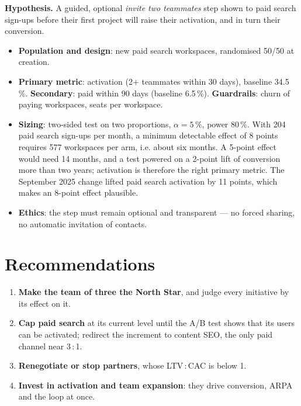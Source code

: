 \documentclass[10pt,a4paper]{article}
\begin{document}
\textbf{Hypothesis.} A guided, optional \emph{invite two teammates} step shown to paid search sign-ups before their first project will raise their activation, and in turn their conversion.
\begin{itemize}
  \item \textbf{Population and design}: new paid search workspaces, randomised 50/50 at creation.
  \item \textbf{Primary metric}: activation (2+ teammates within 30 days), baseline 34.5\,\%. \textbf{Secondary}: paid within 90 days (baseline 6.5\,\%). \textbf{Guardrails}: churn of paying workspaces, seats per workspace.
  \item \textbf{Sizing}: two-sided test on two proportions, $\alpha = 5\,\%$, power 80\,\%. With 204 paid search sign-ups per month, a minimum detectable effect of 8 points requires 577 workspaces per arm, i.e. about six months. A 5-point effect would need 14 months, and a test powered on a 2-point lift of conversion more than two years; activation is therefore the right primary metric. The September 2025 change lifted paid search activation by 11 points, which makes an 8-point effect plausible.
  \item \textbf{Ethics}: the step must remain optional and transparent --- no forced sharing, no automatic invitation of contacts.
\end{itemize}

\section{Recommendations}

\begin{enumerate}
  \item \textbf{Make the team of three the North Star}, and judge every initiative by its effect on it.
  \item \textbf{Cap paid search} at its current level until the A/B test shows that its users can be activated; redirect the increment to content SEO, the only paid channel near 3\,:\,1.
  \item \textbf{Renegotiate or stop partners}, whose LTV\,:\,CAC is below 1.
  \item \textbf{Invest in activation and team expansion}: they drive conversion, ARPA and the loop at once.
\end{enumerate}
\end{document}
